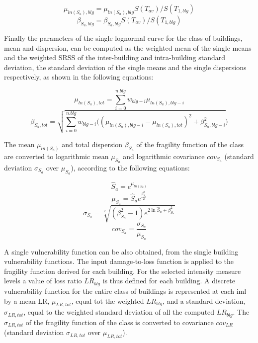 \begin{equation}
\mu_{ln(S_a), blg} = \mu_{ln(S_a), blg} S(T_{av})/ S(T_{1, blg})
\end{equation}
\begin{equation}
\beta_{S_a, blg} = \beta_{S_a, blg} S(T_{av})/ S(T_{1, blg})
\label{eq:Sa(Tav)}
\end{equation}

Finally the parameters of the single lognormal curve for the class of buildings, mean and dispersion, can be computed as the weighted mean of the single means and the weighted SRSS of the inter-building and intra-building standard deviation, the standard deviation of the single means and the single dispersions respectively, as shown in the following equations:

\begin{equation}
\mu_{ln(S_a), tot} = \sum_{i=0}^{n.blg} w_{blg-i} \mu_{ln(S_a), blg-i}
\label{eq:combination-lognormals-mu}
\end{equation}
\begin{equation}
\beta_{S_a, tot} = \sqrt{ \sum_{i=0}^{n.blg} w_{blg-i} ((\mu_{ln(S_a), blg-i}-\mu_{ln(S_a), tot})^2+ \beta_{S_a, blg-i}^2})
\label{eq:combination-lognormals-sigma}
\end{equation}

The mean $\mu_{ln(S_a)}$ and total dispersion $\beta_{S_a}$ of the fragility function of the class are converted to logarithmic mean $\mu_{S_a}$ and logarithmic covariance $cov_{S_a}$ (standard deviation $\sigma_{S_a}$ over $\mu_{S_a}$), according to the following equations:

\begin{equation}
\hat{S}_a = e^{\mu_{ln(S_a)}}
\end{equation}
\begin{equation}
\mu_{S_a} = \hat{S}_a e^{\frac{\beta_{S_a}^2}{2}}
\label{eq:median-to-mean}
\end{equation}
\begin{equation}
\sigma_{S_a} = \sqrt[2]{(\beta_{S_a}^2-1) e^{2\ln{ \hat{S}_a}+\beta_{S_a}^2}}
\label{eq:dispersion-to-standard}
\end{equation}
\begin{equation}
cov_{S_a} = \frac{\sigma_{S_a}}{\mu_{S_a} }
\end{equation}

A single vulnerability function can be also obtained, from the single building vulnerability functions. The input damage-to-loss function is applied to the fragility function derived for each building. For the selected intensity measure levels a value of loss ratio $LR_{blg}$ is thus defined for each building. A discrete vulnerability function for the entire class of buildings is represented at each iml by a mean LR, $\mu_{LR,tot}$, equal tot the weighted $LR_{blg}$, and a standard deviation, $\sigma_{LR, tot}$, equal to the weighted standard deviation of all the computed $LR_{blg}$. The $\sigma_{LR, tot}$ of the fragility function of the class is converted to covariance $cov_{LR}$ (standard deviation $\sigma_{LR, tot}$ over $\mu_{LR, tot}$).

